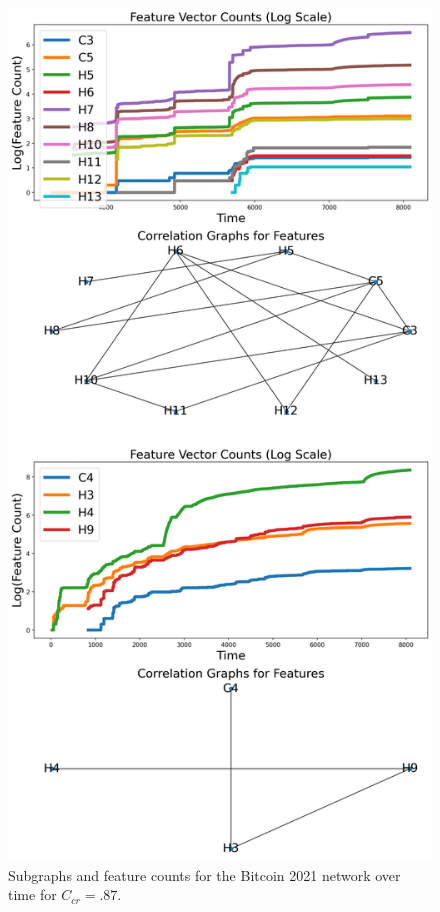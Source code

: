 \documentclass[a4paper,11pt]{article}
\begin{document}
\begin{figure}[h!]
    \includegraphics[width=.8\linewidth]{Images/Bitcoin2021/connected_components.png}
    \centering
    \caption{Subgraphs and feature counts for the Bitcoin 2021 network over time for $C_{cr}=.87$.}
\end{figure}
\clearpage
\pagebreak
\end{document}

